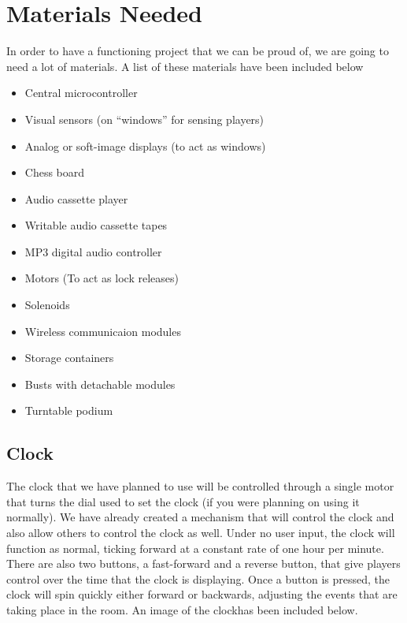 \documentclass[conference]{IEEEtran}
\begin{document}
\section{Materials Needed}
In order to have a functioning project that we can be proud of, we are going to need a lot of materials.
A list of these materials have been included below
\begin{itemize}
    \item Central microcontroller
    \item Visual sensors (on ``windows'' for sensing players)
    \item Analog or soft-image displays (to act as windows)
    \item Chess board
    \item Audio cassette player
    \item Writable audio cassette tapes
    \item MP3 digital audio controller
    \item Motors (To act as lock releases)
    \item Solenoids
    \item Wireless communicaion modules
    \item Storage containers
    \item Busts with detachable modules
    \item Turntable podium
\end{itemize}

\subsection*{Clock}
The clock that we have planned to use will be controlled through a single motor that turns the
dial used to set the clock (if you were planning on using it normally). We have already created
a mechanism that will control the clock and also allow others to control the clock as well. Under
no user input, the clock will function as normal, ticking forward at a constant rate of one hour per
minute. There are also two buttons, a fast-forward and a reverse button, that give players control
over the time that the clock is displaying. Once a button is pressed, the clock will spin quickly
either forward or backwards, adjusting the events that are taking place in the room. An image of
the clockhas been included below.
\end{document}
